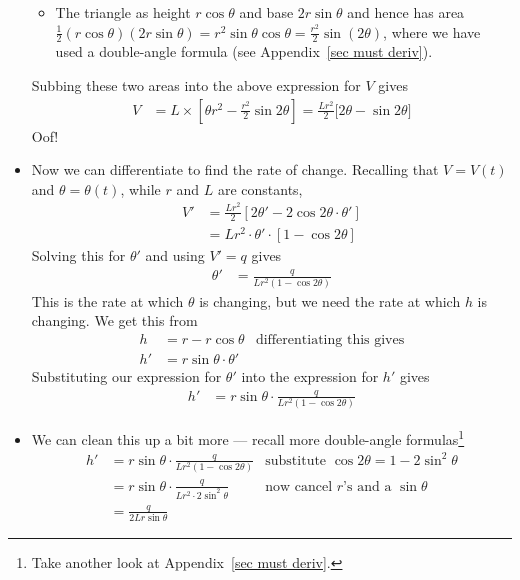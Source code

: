 \begin{eg}
\begin{itemize}
\begin{itemize}
\item The triangle   as height $r\cos\theta$ and base $2r\sin\theta$
and hence has area $\frac{1}{2}(r\cos\theta)(2r\sin\theta)=r^2\sin\theta\cos\theta =
\frac{r^2}{2} \sin(2\theta)$, where we have used a double-angle formula (see
Appendix~\ref{sec must deriv}).
\end{itemize}
Subbing these two areas into the above expression for $V$ gives
\begin{align*}
  V & = L\times\left[\theta r^2- \frac{r^2}{2}\sin2\theta\right]
  = \frac{Lr^2}{2} \big[2\theta-\sin2\theta \big]
\end{align*}
Oof!
\item Now we can differentiate to find the rate of change. Recalling that $V=V(t)$ and
$\theta=\theta(t)$, while $r$ and $L$ are constants,
\begin{align*}
  V'
  &=\frac{Lr^2}{2} \left[ 2\theta' - 2\cos2\theta \cdot \theta' \right]\\
  &= Lr^2 \cdot \theta' \cdot \left[1 - \cos2\theta \right]
%
\end{align*}
Solving this for $\theta'$ and using $V'=q$ gives
\begin{align*}
  \theta' &= \frac{q}{Lr^2 (1-\cos2\theta)}
\end{align*}
This is the rate at which $\theta$ is changing, but we need the rate at which $h$ is
changing. We get this from
\begin{align*}
  h &= r - r\cos \theta & \text{differentiating this gives}\\
  h' &= r\sin\theta \cdot \theta'
\end{align*}
Substituting our expression for $\theta'$ into the expression for $h'$ gives
\begin{align*}
  h' &= r\sin\theta \cdot \frac{q}{Lr^2 (1-\cos2\theta)}
\end{align*}

\item We can clean this up a bit more --- recall more double-angle
formulas\footnote{Take another look at Appendix~\ref{sec must deriv}.}
\begin{align*}
  h'
&= r\sin\theta \cdot \frac{q}{Lr^2 (1-\cos2\theta)} & \text{substitute $\cos2\theta =
1-2\sin^2\theta$}\\
&= r\sin\theta \cdot \frac{q}{Lr^2 \cdot 2\sin^2\theta} & \text{now cancel $r$'s and a $\sin\theta$}\\
&= \frac{q}{2Lr\sin\theta}
\end{align*}


\end{itemize}
\end{eg}
